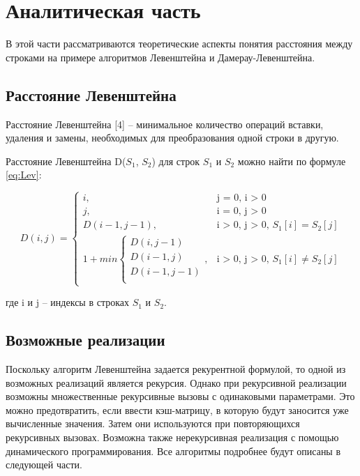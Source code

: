 \documentclass{article}
\begin{document}
\clearpage\section{Аналитическая часть}
В этой части рассматриваются теоретические аспекты понятия расстояния между строками на примере алгоритмов 
Левенштейна и Дамерау-Левенштейна.

\subsection{Расстояние Левенштейна}
Расстояние Левенштейна [4] -- минимальное количество операций вставки, удаления и замены, необходимых для
преобразования одной строки в другую. 

Расстояние Левенштейна D($S_{1}$, $S_{2}$) для строк $S_{1}$ и $S_{2}$ можно найти  по формуле \ref{eq:Lev}:

\begin{equation}
	\label{eq:Lev}
	D(i, j) = \begin{cases}
	i, &\text{j = 0, i > 0}\\
	j, &\text{i = 0, j > 0}\\
	D(i - 1, j - 1), &\text{i > 0, j > 0, $S_{1}[i] = S_{2}[j]$}\\
	1 + min \begin{cases}
		D(i, j - 1)\\
		D(i - 1, j)\\
		D(i - 1, j - 1)\\
	\end{cases}, &\text{i > 0, j > 0, $S_{1}[i] \neq S_{2}[j]$}
	\end{cases}
\end{equation}

где i и j -- индексы в строках $S_{1}$ и $S_{2}$.

\subsection{Возможные реализации}
Поскольку алгоритм Левенштейна задается рекурентной формулой, то одной из возможных реализаций
является рекурсия. Однако при рекурсивной реализации возможны множественные рекурсивные вызовы
с одинаковыми параметрами. Это можно предотвратить, если ввести кэш-матрицу, в которую будут заносится
уже вычисленные значения. Затем они используются при повторяющихся рекурсивных вызовах. Возможна также 
нерекурсивная реализация с помощью динамического программирования. Все алгоритмы подробнее будут
описаны в следующей части.
\end{document}
